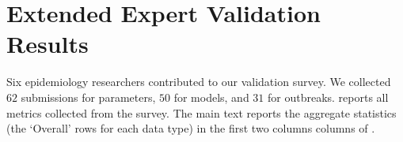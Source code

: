 \clearpage
\section{Extended Expert Validation Results}

Six epidemiology researchers contributed to our validation survey. We collected $62$ submissions for parameters, $50$ for models, and $31$ for outbreaks.  reports all metrics collected from the survey. The main text reports the aggregate statistics (the ‘Overall’ rows for each data type) in the first two columns columns of .





